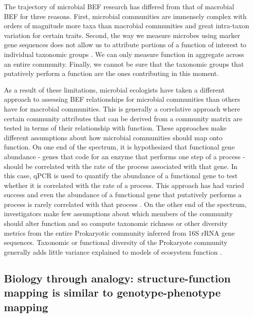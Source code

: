 \documentclass{article}
\begin{document}
The trajectory of microbial BEF research has differed from that of macrobial BEF
for three reasons. First, microbial communities are
immensely complex with orders of magnitude more taxa than macrobial communities
and great intra-taxon variation for certain traits. Second, the way we measure
microbes using marker gene sequences does not allow us to attribute portions of
a function of interest to individual taxonomic groups . We can only
measure function in aggregate across an entire community. Finally, we cannot be
sure that the taxonomic groups that putatively perform a function are the ones
contributing in this moment.

As a result of these limitations, microbial ecologists have taken a different
approach to assessing BEF relationships for microbial communities than others
have for macrobial communities. This is generally a correlative approach where
certain community attributes that can be derived from a community matrix are
tested in terms of their relationship with function. These approaches make
different assumptions about how microbial communities should map onto function.
On one end of the spectrum, it is hypothesized that functional gene abundance - genes that
code for an enzyme that performs one step of a process - should be correlated
with the rate of the process associated with that gene. In this case, qPCR
is used to quantify the abundance of a functional gene to test whether it is
correlated with the rate of a process. This approach has had varied success and even the abundance of a
functional gene that putatively performs a process is rarely correlated with
that process \citep{rocca2015}. On the other end of the
spectrum, investigators make few assumptions about which members of the community should
alter function and so compute
taxonomic richness or other diversity metrics from the entire Prokaryotic
community inferred from 16S rRNA gene sequences. Taxonomic or functional
diversity of the Prokaryote community generally adds little variance explained
to models of ecosystem function \citep{graham2016}.

\subsection{Biology through analogy: structure-function mapping is similar
to genotype-phenotype mapping}
\end{document}
